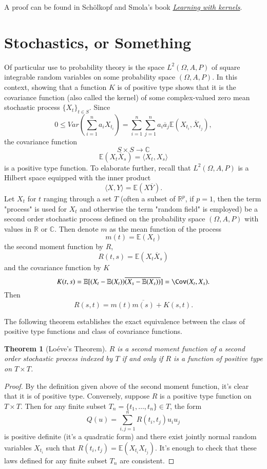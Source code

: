 \documentclass{article}
\newtheorem{thm}{Theorem}[section]
\theoremstyle{definition}
\theoremstyle{remark}
\numberwithin{equation}{section}
\begin{document}
A proof can be found in Sch\"{o}lkopf and Smola's book \href{https://mitpress.mit.edu/books/learning-kernels}{\textit{Learning with kernels}}.

\section{Stochastics, or Something}
Of particular use to probability theory is the space $L^2(\Omega, A, P)$ of square integrable random variables on some probability space $(\Omega, A, P)$. In this context, showing that a function $K$ is of positive type shows that it is the covariance function (also called the kernel) of some complex-valued zero mean stochastic process $\{ X_t \} _{t \in S}$. Since 
$$0 \leq Var \left( \sum _{i = 1} ^n a_i X_{t_i} \right) = \sum ^n _{i = 1} \sum ^n _{j = 1} a_i \overline{a}_j \mathbb{E} (X_{t_i}, \overline{X}_{t_j} ),  $$
the covariance function 
$$S \times S \rightarrow \mathbb{C} $$
$$\mathbb{E} (X_t \overline{X} _s) = \langle X_t, X_s \rangle  $$
is a positive type function. To elaborate further, recall that $L^2(\Omega, A, P)$ is a Hilbert space equipped with the inner product 
$$\langle X, Y \rangle = \mathbb{E}(X\overline{Y}). $$
Let $X_t$ for $t$ ranging through a set $T$ (often a subset of $\mathbb{R}^p$, if $p = 1$, then the term "process" is used for $X_t$ and otherwise the term "random field" is employed) be a second order stochastic process defined on the probability space $(\Omega, A, P)$ with values in $\mathbb{R}$ or $\mathbb{C}$. Then denote $m$ as the mean function of the process 
$$m(t) = \mathbb{E} (X_t) $$
the second moment function by $R$, 
$$R(t, s) = \mathbb{E} (X_t \overline{X}_s) $$
and the covariance function by $K$ 
$$K(t, s) = \mathbb{E} [(X_t - \mathbb{E}(X_t)) \overline{(X_s - \mathbb{E}(X_s))}]= \Cov(X_t, X_s). $$
Then 
$$R(s, t) = m(t) \overline{m(s)} + K(s,t). $$

The following theorem establishes the exact equivalence between the class of positive type functions and class of covariance functions. 

\begin{thm}[Lo\'{e}ve's Theorem]
$R$ is a second moment function of a second order stochastic process indexed by $T$ if and only if $R$ is a function of positive type on $T \times T$.
\end{thm}

\begin{proof}
By the definition given above of the second moment function, it's clear that it is of positive type. Conversely, suppose $R$ is a positive type function on $T \times T$. Then for any finite subset $T_n = \{ t_1, \dots, t_n \} \in T$, the form 
$$Q(u) = \sum _{i, j = 1} ^n R(t_i, t_j) u_i u_j $$
is positive definite (it's a quadratic form) and there exist jointly normal random variables $X_{t_i}$ such that $R(t_i, t_j) = \mathbb{E} (X_{t_i} X_{t_j}).$ It's enough to check that these laws defined for any finite subset $T_n$ are consistent. 
\end{proof}
\end{document}
